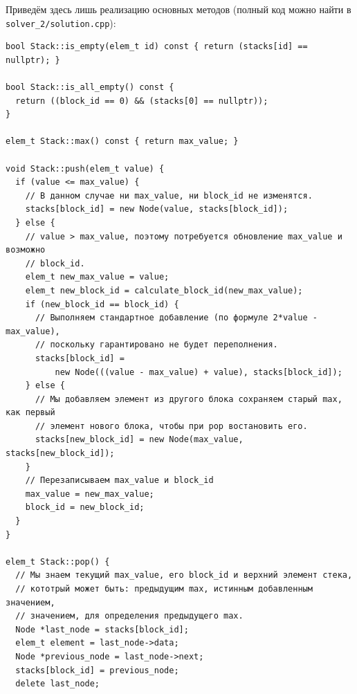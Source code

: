 Приведём здесь лишь реализацию основных методов (полный код можно найти в \texttt{solver_2/solution.cpp}):
\begin{verbatim}
bool Stack::is_empty(elem_t id) const { return (stacks[id] == nullptr); }

bool Stack::is_all_empty() const {
  return ((block_id == 0) && (stacks[0] == nullptr));
}

elem_t Stack::max() const { return max_value; }

void Stack::push(elem_t value) {
  if (value <= max_value) {
    // В данном случае ни max_value, ни block_id не изменятся.
    stacks[block_id] = new Node(value, stacks[block_id]);
  } else {
    // value > max_value, поэтому потребуется обновление max_value и возможно
    // block_id.
    elem_t new_max_value = value;
    elem_t new_block_id = calculate_block_id(new_max_value);
    if (new_block_id == block_id) {
      // Выполняем стандартное добавление (по формуле 2*value - max_value),
      // поскольку гарантировано не будет переполнения.
      stacks[block_id] =
          new Node(((value - max_value) + value), stacks[block_id]);
    } else {
      // Мы добавляем элемент из другого блока сохраняем старый max, как первый
      // элемент нового блока, чтобы при pop востановить его.
      stacks[new_block_id] = new Node(max_value, stacks[new_block_id]);
    }
    // Перезаписываем max_value и block_id
    max_value = new_max_value;
    block_id = new_block_id;
  }
}

elem_t Stack::pop() {
  // Мы знаем текущий max_value, его block_id и верхний элемент стека,
  // кототрый может быть: предыдущим max, истинным добавленным значением,
  // значением, для определения предыдущего max.
  Node *last_node = stacks[block_id];
  elem_t element = last_node->data;
  Node *previous_node = last_node->next;
  stacks[block_id] = previous_node;
  delete last_node;


\end{verbatim}
